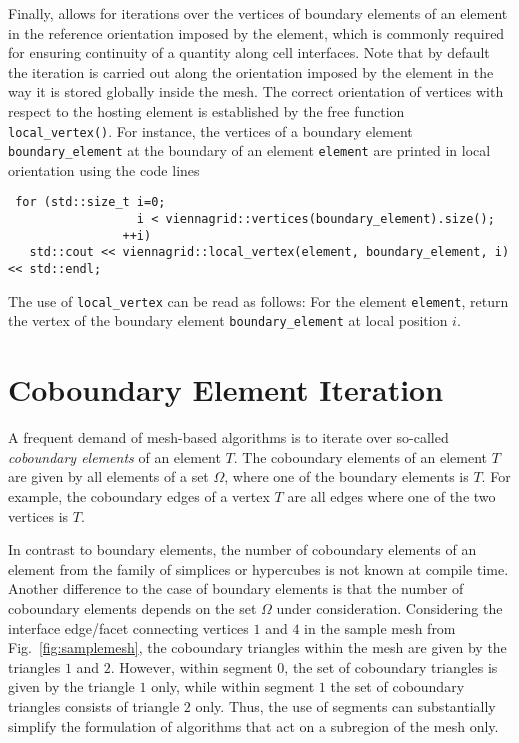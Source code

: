 
Finally, {\ViennaGrid} allows for iterations over the vertices of boundary elements of an element in the reference orientation imposed by the element, which is commonly required for ensuring continuity of a quantity along cell interfaces. Note that by default the iteration is carried out along the orientation imposed by the element in the way it is stored globally inside the mesh.
The correct orientation of vertices with respect to the hosting element is established by the free function \lstinline|local_vertex()|. 
For instance, the vertices of a boundary element \lstinline|boundary_element| at the boundary of an element \lstinline|element| are printed in local orientation using the code lines
\begin{lstlisting}
 for (std::size_t i=0;
                  i < viennagrid::vertices(boundary_element).size();
                ++i)
   std::cout << viennagrid::local_vertex(element, boundary_element, i) << std::endl;
\end{lstlisting}
The use of \lstinline|local_vertex| can be read as follows: For the element \lstinline|element|, return the vertex of the boundary element \lstinline|boundary_element| at local position $i$.

\section{Coboundary Element Iteration}
A frequent demand of mesh-based algorithms is to iterate over so-called \emph{coboundary elements} of an element $T$.
The coboundary elements of an element $T$ are given by all elements of a set $\Omega$, where one of the boundary elements is $T$.
For example, the coboundary edges of a vertex $T$ are all edges where one of the two vertices is $T$.

In contrast to boundary elements, the number of coboundary elements of an element from the family of simplices or hypercubes is not known at compile time.
Another difference to the case of boundary elements is that the number of coboundary elements depends on the set $\Omega$ under consideration.
Considering the interface edge/facet connecting vertices $1$ and $4$ in the sample mesh from Fig.~\ref{fig:samplemesh}, the coboundary triangles within the mesh are given by the triangles $1$ and $2$.
However, within segment $0$, the set of coboundary triangles is given by the triangle $1$ only, while within segment $1$ the set of coboundary triangles consists of triangle $2$ only.
Thus, the use of segments can substantially simplify the formulation of algorithms that act on a subregion of the mesh only.

